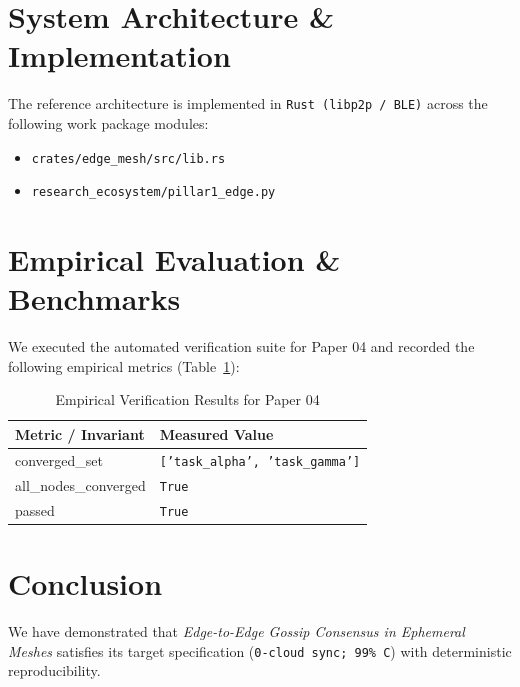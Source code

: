 \documentclass[10pt,twocolumn]{article}
\begin{document}
\section{System Architecture \& Implementation}
The reference architecture is implemented in \texttt{Rust (libp2p / BLE)} across the following work package modules:
\begin{itemize}
  \item \texttt{crates/edge\_mesh/src/lib.rs}
  \item \texttt{research\_ecosystem/pillar1\_edge.py}
\end{itemize}

\section{Empirical Evaluation \& Benchmarks}
We executed the automated verification suite for Paper 04 and recorded the following empirical metrics (Table~\ref{tab:metrics}):

\begin{table}[htbp]
\centering
\caption{Empirical Verification Results for Paper 04}
\label{tab:metrics}
\begin{tabular}{ll}
\toprule
\textbf{Metric / Invariant} & \textbf{Measured Value} \\
\midrule
    converged\_set & \texttt{['task\_alpha', 'task\_gamma']} \\
    all\_nodes\_converged & \texttt{True} \\
    passed & \texttt{True} \\
\bottomrule
\end{tabular}
\end{table}

\section{Conclusion}
We have demonstrated that \textit{Edge-to-Edge Gossip Consensus in Ephemeral Meshes} satisfies its target specification (\texttt{0-cloud sync; 99\% C}) with deterministic reproducibility.



\end{document}
